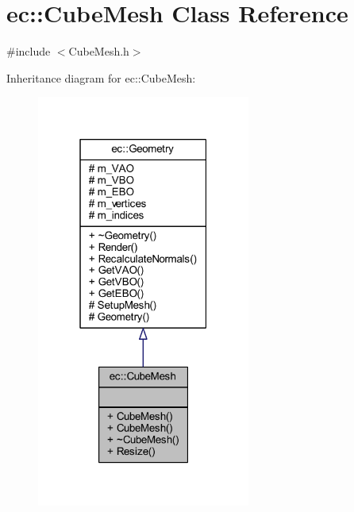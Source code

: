\hypertarget{classec_1_1_cube_mesh}{}\section{ec\+:\+:Cube\+Mesh Class Reference}
\label{classec_1_1_cube_mesh}


{\ttfamily \#include $<$Cube\+Mesh.\+h$>$}



Inheritance diagram for ec\+:\+:Cube\+Mesh\+:\nopagebreak
\begin{figure}[H]
\begin{center}
\leavevmode
\includegraphics[width=199pt]{classec_1_1_cube_mesh__inherit__graph}
\end{center}
\end{figure}


